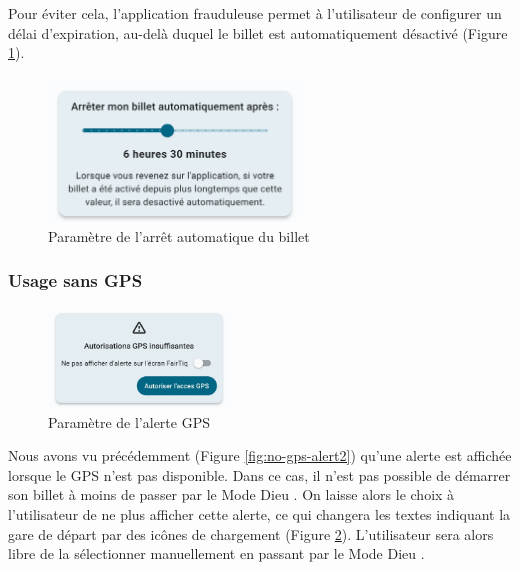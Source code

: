 \documentclass[a4paper]{article}
\newcommand{\modedieu}{\og Mode Dieu \fg}
\begin{document}
Pour éviter cela, l'application frauduleuse permet à l'utilisateur de configurer un
délai d'expiration, au-delà duquel le billet est automatiquement désactivé (Figure \ref*{fig:auto_stop}).


\begin{figure}[h]
  \includegraphics[width=0.6\textwidth]{illustrations/images/mode_dieu/auto_stop.jpg}
  \centering
  \caption{Paramètre de l'arrêt automatique du billet}
  \label{fig:auto_stop}
\end{figure}

\subsubsection{Usage sans GPS} \label{sssec:no_gps_usage}


\begin{figure}
  \begin{center}
    \includegraphics[width=0.43\textwidth]{illustrations/images/no-gps/discard_alert.jpg}
  \end{center}
  \caption{Paramètre de l'alerte GPS}
  \label{fig:discard_alert}
\end{figure}

Nous avons vu précédemment (Figure \ref{fig:no-gps-alert2}) qu'une alerte est affichée lorsque
le GPS n'est pas disponible. Dans ce cas, il n'est pas possible de démarrer son billet à moins de passer
par le \modedieu. On laisse alors le choix à l'utilisateur de ne plus afficher cette alerte,
ce qui changera les textes indiquant la gare de départ par des icônes de chargement (Figure \ref*{fig:discard_alert}).
L'utilisateur sera alors libre de la sélectionner manuellement en passant par le \modedieu.
\end{document}
